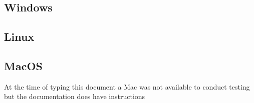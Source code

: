 \subsection{Windows}






\subsection{Linux}



\subsection{MacOS}
At the time of typing this document a Mac was not available to conduct testing
but the documentation\cite{Docker:Mac_Install} does have instructions

\clearpage
